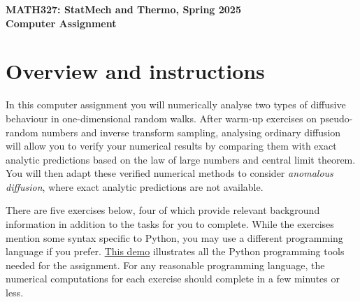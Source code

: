 \documentclass[12 pt]{article} %
\begin{document}
\newcommand{\thisunit}{MATH327 Comp.~Assign.}
\newcommand{\moddate}{Last modified 28 Jan.~2025}
\begin{center}
  {\Large \textbf{MATH327: StatMech and Thermo, Spring 2025}} \\[12 pt]
  {\Large \textbf{Computer Assignment}} \\[24 pt]
\end{center}

\section*{Overview and instructions}
In this computer assignment you will numerically analyse two types of diffusive behaviour in one-dimensional random walks.
After warm-up exercises on pseudo-random numbers and inverse transform sampling, analysing ordinary diffusion will allow you to verify your numerical results by comparing them with exact analytic predictions based on the law of large numbers and central limit theorem.
You will then adapt these verified numerical methods to consider \textit{anomalous diffusion}, where exact analytic predictions are not available.

There are five exercises below, four of which provide relevant background information in addition to the tasks for you to complete.
While the exercises mention some syntax specific to Python, you may use a different programming language if you prefer.
\href{https://tinyurl.com/math327demo}{This demo} illustrates all the Python programming tools needed for the assignment.
For any reasonable programming language, the numerical computations for each exercise should complete in a few minutes or less.
\end{document}
